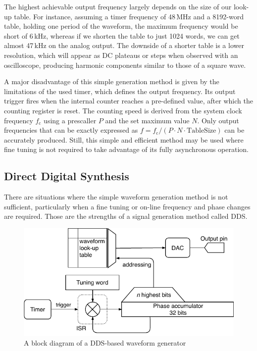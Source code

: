 The highest achievable output frequency largely depends on the size of our look-up table. For instance, assuming a timer frequency of 48\,MHz and a 8192-word table, holding one period of the waveform, the maximum frequency would be short of 6\,kHz, whereas if we shorten the table to just 1024 words, we can get almost 47\,kHz on the analog output. The downside of a shorter table is a lower resolution, which will appear as \gls{DC} plateaus or steps when observed with an oscilloscope, producing harmonic components similar to those of a square wave.

A major disadvantage of this simple generation method is given by the limitations of the used timer, which defines the output frequency. Its output trigger fires when the internal counter reaches a pre-defined value, after which the counting register is reset. The counting speed is derived from the system clock frequency $f_\mathrm{c}$ using a prescaller $P$ and the set maximum value $N$. Only output frequencies that can be exactly expressed as $f=f_\mathrm{c}/(P\cdot N \cdot \mathrm{TableSize})$ can be accurately produced. Still, this simple and efficient method may be used where fine tuning is not required to take advantage of its fully asynchronous operation.

\subsection{Direct Digital Synthesis} \label{sec:theory-dac-dds}

There are situations where the simple waveform generation method is not sufficient, particularly when a fine tuning or on-line frequency and phase changes are required. Those are the strengths of a signal generation method called \gls{DDS}.

\begin{figure}[h]
	\centering
	\includegraphics[scale=1] {img/wavegen-dds.pdf}
	\caption{\label{fig:wavegen-dds}A block diagram of a DDS-based waveform generator}
\end{figure}

